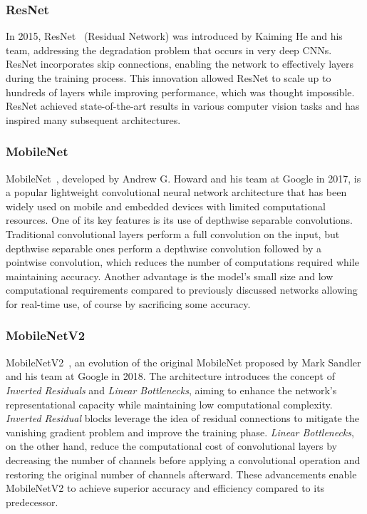 \subsubsection{ResNet}

In 2015, ResNet~\cite{He2015} (Residual Network) was introduced by Kaiming He
and his team, addressing the degradation problem that occurs in very deep CNNs.
ResNet incorporates skip connections, enabling the network to effectively
 layers during the training process. This innovation allowed ResNet to
scale up to hundreds of layers while improving performance, which was thought
impossible.  ResNet achieved state-of-the-art results in various computer vision
tasks and has inspired many subsequent architectures.


\subsubsection{MobileNet}

MobileNet~\cite{Howard2017}, developed by Andrew G. Howard and his team at
Google in 2017, is a popular lightweight convolutional neural network
architecture that has been widely used on mobile and embedded devices with
limited computational resources. One of its key features is its use of depthwise
separable convolutions. Traditional convolutional layers perform a full
convolution on the input, but depthwise separable ones perform a depthwise
convolution followed by a pointwise convolution, which reduces the number of
computations required while maintaining accuracy. Another advantage is the
model's small size and low computational requirements compared to previously
discussed networks allowing for real-time use, of course by sacrificing some
accuracy.


\subsubsection{MobileNetV2}

MobileNetV2~\cite{Sandler2018}, an evolution of the original MobileNet
proposed by Mark Sandler and his team at Google in 2018. The architecture
introduces the concept of \textit{Inverted Residuals} and \textit{Linear
Bottlenecks}, aiming to enhance the network's representational capacity while
maintaining low computational complexity. \textit{Inverted Residual} blocks
leverage the idea of residual connections to mitigate the vanishing gradient
problem and improve the training phase. \textit{Linear Bottlenecks}, on the
other hand, reduce the computational cost of convolutional layers by decreasing
the number of channels before applying a convolutional operation and restoring
the original number of channels afterward. These advancements enable MobileNetV2
to achieve superior accuracy and efficiency compared to its predecessor.


